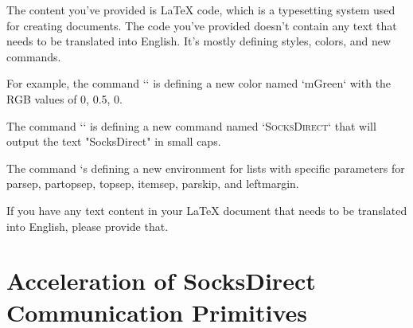 The content you've provided is LaTeX code, which is a typesetting system used for creating documents. The code you've provided doesn't contain any text that needs to be translated into English. It's mostly defining styles, colors, and new commands. 

For example, the command `` is defining a new color named `mGreen` with the RGB values of 0, 0.5, 0. 

The command `\newcommand{\sys}{{\textsc{SocksDirect}}\xspace}` is defining a new command named `\sys` that will output the text "SocksDirect" in small caps.

The command `\newenvironment{icompact}` is defining a new environment for lists with specific parameters for parsep, partopsep, topsep, itemsep, parskip, and leftmargin.

If you have any text content in your LaTeX document that needs to be translated into English, please provide that.

\chapter{Acceleration of SocksDirect Communication Primitives}
\label{chapter:socksdirect}









